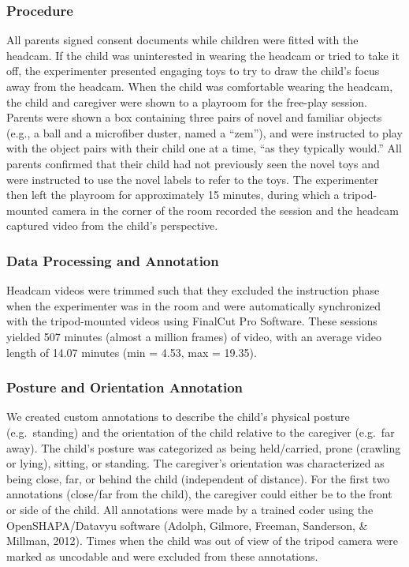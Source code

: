 \documentclass[10pt, letterpaper]{article}
\begin{document}
\subsubsection{Procedure}\label{procedure}

All parents signed consent documents while children were fitted with the
headcam. If the child was uninterested in wearing the headcam or tried
to take it off, the experimenter presented engaging toys to try to draw
the child's focus away from the headcam. When the child was comfortable
wearing the headcam, the child and caregiver were shown to a playroom
for the free-play session. Parents were shown a box containing three
pairs of novel and familiar objects (e.g., a ball and a microfiber
duster, named a ``zem''), and were instructed to play with the object
pairs with their child one at a time, ``as they typically would.'' All
parents confirmed that their child had not previously seen the novel
toys and were instructed to use the novel labels to refer to the toys.
The experimenter then left the playroom for approximately 15 minutes,
during which a tripod-mounted camera in the corner of the room recorded
the session and the headcam captured video from the child's perspective.

\subsubsection{Data Processing and
Annotation}\label{data-processing-and-annotation}

Headcam videos were trimmed such that they excluded the instruction
phase when the experimenter was in the room and were automatically
synchronized with the tripod-mounted videos using FinalCut Pro Software.
These sessions yielded 507 minutes (almost a million frames) of video,
with an average video length of 14.07 minutes (min = 4.53, max = 19.35).

\subsubsection{Posture and Orientation
Annotation}\label{posture-and-orientation-annotation}

We created custom annotations to describe the child's physical posture
(e.g.~standing) and the orientation of the child relative to the
caregiver (e.g.~far away). The child's posture was categorized as being
held/carried, prone (crawling or lying), sitting, or standing. The
caregiver's orientation was characterized as being close, far, or behind
the child (independent of distance). For the first two annotations
(close/far from the child), the caregiver could either be to the front
or side of the child. All annotations were made by a trained coder using
the OpenSHAPA/Datavyu software (Adolph, Gilmore, Freeman, Sanderson, \&
Millman, 2012). Times when the child was out of view of the tripod
camera were marked as uncodable and were excluded from these
annotations.
\end{document}
